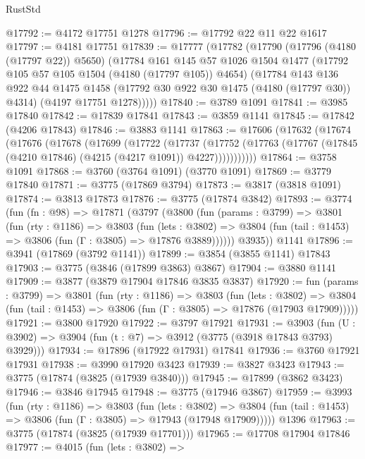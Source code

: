 \begin{lexlean}{RustStd}
\begin{coremodule}
{\begin{coremodule}
{{{{{{{{{{{{{{{{{{{{{{{{{{{{{{{@17792 := @4172 @17751 @1278
@17796 := @17792 @22 @11 @22 @1617
@17797 := @4181 @17751
@17839 := @17777
    (@17782
      (@17790
        (@17796 (@4180 (@17797 @22)) @5650)
        (@17784
          @161
          @145
          @57
          @1026
          @1504
          @1477
          (@17792 @105 @57 @105 @1504 (@4180 (@17797 @105)) @4654)
          (@17784
            @143
            @136
            @922
            @44
            @1475
            @1458
            (@17792 @30 @922 @30 @1475 (@4180 (@17797 @30)) @4314)
            (@4197 @17751 @1278)))))
@17840 := @3789 @1091
@17841 := @3985 @17840
@17842 := @17839 @17841
@17843 := @3859 @1141
@17845 := @17842 (@4206 @17843)
@17846 := @3883 @1141
@17863 := @17606
    (@17632
      (@17674
        (@17676
          (@17678
            (@17699
              (@17722
                (@17737
                  (@17752
                    (@17763 (@17767 (@17845 (@4210 @17846) (@4215 (@4217 @1091)) @4227)))))))))))
@17864 := @3758 @1091
@17868 := @3760 (@3764 @1091) (@3770 @1091)
@17869 := @3779 @17840
@17871 := @3775 (@17869 @3794)
@17873 := @3817 (@3818 @1091)
@17874 := @3813 @17873
@17876 := @3775 (@17874 @3842)
@17893 := @3774
    (fun (fn : @98) =>
    @17871
      (@3797
        (@3800
          (fun (params : @3799) =>
          @3801
            (fun (rty : @1186) =>
            @3803
              (fun (lets : @3802) =>
              @3804 (fun (tail : @1453) => @3806 (fun (Γ : @3805) => @17876 @3889))))))
        @3935))
    @1141
@17896 := @3941 (@17869 (@3792 @1141))
@17899 := @3854 (@3855 @1141) @17843
@17903 := @3775 (@3846 (@17899 @3863) @3867)
@17904 := @3880 @1141
@17909 := @3877 (@3879 @17904 @17846 @3835 @3837)
@17920 := fun (params : @3799) =>
  @3801
    (fun (rty : @1186) =>
    @3803
      (fun (lets : @3802) =>
      @3804 (fun (tail : @1453) => @3806 (fun (Γ : @3805) => @17876 (@17903 @17909)))))
@17921 := @3800 @17920
@17922 := @3797 @17921
@17931 := @3903
    (fun (U : @3902) => @3904 (fun (t : @7) => @3912 (@3775 (@3918 @17843 @3793) @3929)))
@17934 := @17896 (@17922 @17931) @17841
@17936 := @3760 @17921 @17931
@17938 := @3990 @17920 @3423
@17939 := @3827 @3423
@17943 := @3775 (@17874 (@3825 (@17939 @3840)))
@17945 := @17899 (@3862 @3423)
@17946 := @3846 @17945
@17948 := @3775 (@17946 @3867)
@17959 := @3993
    (fun (rty : @1186) =>
    @3803
      (fun (lets : @3802) =>
      @3804 (fun (tail : @1453) => @3806 (fun (Γ : @3805) => @17943 (@17948 @17909)))))
    @1396
@17963 := @3775 (@17874 (@3825 (@17939 @17701)))
@17965 := @17708 @17904 @17846
@17977 := @4015
    (fun (lets : @3802) =>
}}}}}}}}}}}}}}}}}}}}}}}}}}}}}}}
\end{coremodule}}
\end{coremodule}
\end{lexlean}
